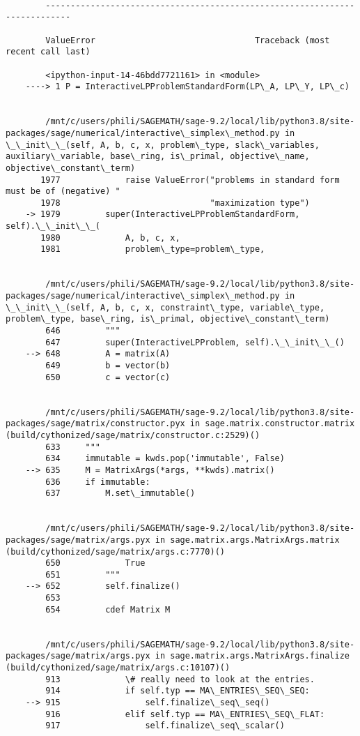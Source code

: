 \documentclass[11pt]{article}
\begin{document}
    \begin{Verbatim}[commandchars=\\\{\}]

        ---------------------------------------------------------------------------

        ValueError                                Traceback (most recent call last)

        <ipython-input-14-46bdd7721161> in <module>
    ----> 1 P = InteractiveLPProblemStandardForm(LP\_A, LP\_Y, LP\_c)
    

        /mnt/c/users/phili/SAGEMATH/sage-9.2/local/lib/python3.8/site-packages/sage/numerical/interactive\_simplex\_method.py in \_\_init\_\_(self, A, b, c, x, problem\_type, slack\_variables, auxiliary\_variable, base\_ring, is\_primal, objective\_name, objective\_constant\_term)
       1977             raise ValueError("problems in standard form must be of (negative) "
       1978                              "maximization type")
    -> 1979         super(InteractiveLPProblemStandardForm, self).\_\_init\_\_(
       1980             A, b, c, x,
       1981             problem\_type=problem\_type,


        /mnt/c/users/phili/SAGEMATH/sage-9.2/local/lib/python3.8/site-packages/sage/numerical/interactive\_simplex\_method.py in \_\_init\_\_(self, A, b, c, x, constraint\_type, variable\_type, problem\_type, base\_ring, is\_primal, objective\_constant\_term)
        646         """
        647         super(InteractiveLPProblem, self).\_\_init\_\_()
    --> 648         A = matrix(A)
        649         b = vector(b)
        650         c = vector(c)


        /mnt/c/users/phili/SAGEMATH/sage-9.2/local/lib/python3.8/site-packages/sage/matrix/constructor.pyx in sage.matrix.constructor.matrix (build/cythonized/sage/matrix/constructor.c:2529)()
        633     """
        634     immutable = kwds.pop('immutable', False)
    --> 635     M = MatrixArgs(*args, **kwds).matrix()
        636     if immutable:
        637         M.set\_immutable()


        /mnt/c/users/phili/SAGEMATH/sage-9.2/local/lib/python3.8/site-packages/sage/matrix/args.pyx in sage.matrix.args.MatrixArgs.matrix (build/cythonized/sage/matrix/args.c:7770)()
        650             True
        651         """
    --> 652         self.finalize()
        653 
        654         cdef Matrix M


        /mnt/c/users/phili/SAGEMATH/sage-9.2/local/lib/python3.8/site-packages/sage/matrix/args.pyx in sage.matrix.args.MatrixArgs.finalize (build/cythonized/sage/matrix/args.c:10107)()
        913             \# really need to look at the entries.
        914             if self.typ == MA\_ENTRIES\_SEQ\_SEQ:
    --> 915                 self.finalize\_seq\_seq()
        916             elif self.typ == MA\_ENTRIES\_SEQ\_FLAT:
        917                 self.finalize\_seq\_scalar()



\end{Verbatim}
\end{document}
